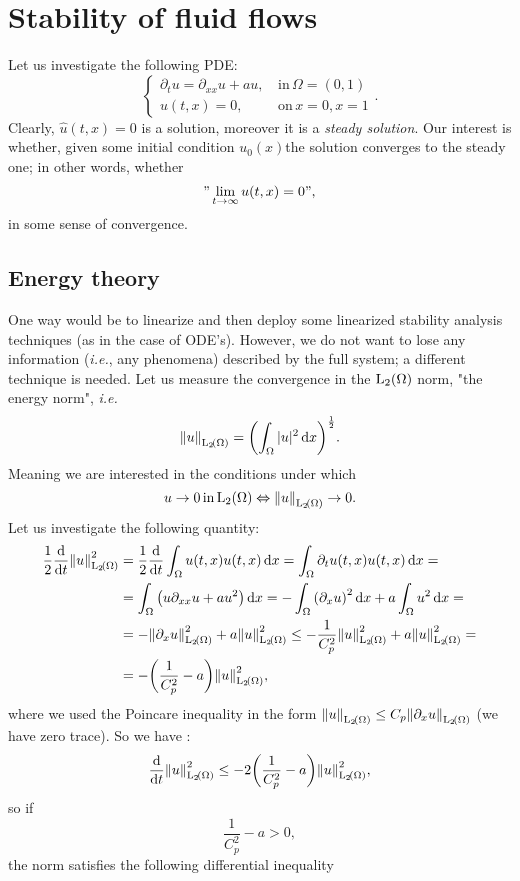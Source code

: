 \documentclass[../main.tex]{subfiles}
\begin{document}
\section{Stability of fluid flows}
\label{sec:stability}

Let us investigate the following PDE:
\[
	\begin{cases}
		\partial_t u = \partial_{xx}u + au, & \, \text{in} \, \Omega = (0,1) \\
		u(t,x) = 0, & \, \text{on} \, x=0, x=1
	\end{cases}.
\]
Clearly, $\hat{u}(t,x) = 0$ is a solution, moreover it is a \textit{steady solution}. Our interest is whether, given some initial condition $u_0(x)$the solution converges to the steady one; in other words, whether
\[
	" \lim_{t \to \infty}u(t,x) = 0",
\]
in some sense of convergence. 


\subsection{Energy theory}
\label{sec:energy_theory}
One way would be to linearize and then deploy some linearized stability analysis techniques (as in the case of ODE's). However, we do not want to lose any information (\textit{i.e.}, any phenomena) described by the full system; a different technique is needed. Let us measure the convergence in the $\LpSet[2]{\Omega}$ norm, "the energy norm", \textit{i.e.}
\[
	\norm{u}_{\LpSet[2]{\Omega}} = \qty(\int_{\Omega}|u|^{2}\dd{x})^{\frac{1}{2}}.
\]
Meaning we are interested in the conditions under which
\[
	u \to 0 \, \text{in} \,\LpSet[2]{\Omega} \Leftrightarrow \norm{u}_{\LpSet[2]{\Omega}} \to 0.
\]
Let us investigate the following quantity:
\begin{align*}
	\frac{1}{2}\dv{t} \norm{u}_{\LpSet[2]{\Omega}}^{2} &= \frac{1}{2} \dv{t} \int_{\Omega}u\qty(t,x) u\qty(t,x)\dd{x} = \int_{\Omega}\partial_t u\qty(t,x) u\qty(t,x)\dd{x} =\\
							   &=\int_{\Omega}\qty(u \partial_{xx}u+ a u^{2})\dd{x} = -\int_{\Omega}\qty(\partial_x u)^{2}\dd{x} + a \int_{\Omega}u^{2}\dd{x} = \\
							   & = -\norm{\partial_x u}_{\LpSet[2]{\Omega}}^{2} + a \norm{u}_{\LpSet[2]{\Omega}}^{2} \leq - \frac{1}{C_p^{2}}\norm{u}_{\LpSet[2]{\Omega}}^{2}+a \norm{u}_{\LpSet[2]{\Omega}}^{2} =\\
							   &=-\qty(\frac{1}{C_p^{2}}-a)\norm{u}_{\LpSet[2]{\Omega}}^{2},
\end{align*}
where we used the Poincare inequality in the form $\norm{u}_{\LpSet[2]{\Omega}} \leq C_p \norm{\partial_x u}_{\LpSet[2]{\Omega}}$ (we have zero trace). So we have :
\[
	\dv{t} \norm{u}_{\LpSet[2]{\Omega}}^{2} \leq -2\qty(\frac{1}{C_p^{2}}-a)\norm{u}_{\LpSet[2]{\Omega}}^{2},
\]
so if
\[
	\frac{1}{C_p^{2}}-a>0,
\]
the norm satisfies the following differential inequality
\end{document}
